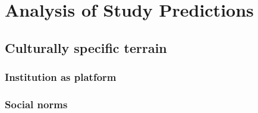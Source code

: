 \section{Analysis of Study Predictions}


  \subsection{Culturally specific terrain}

    \subsubsection{Institution as platform}




    \subsubsection{Social norms}


